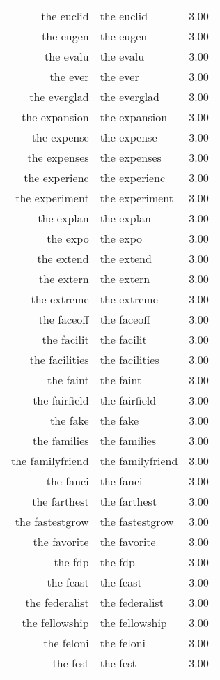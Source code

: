 \begin{table}[ht]
\begin{tabular}{rlr}
  the euclid & the euclid & 3.00 \\ 
  the eugen & the eugen & 3.00 \\ 
  the evalu & the evalu & 3.00 \\ 
  the ever & the ever & 3.00 \\ 
  the everglad & the everglad & 3.00 \\ 
  the expansion & the expansion & 3.00 \\ 
  the expense & the expense & 3.00 \\ 
  the expenses & the expenses & 3.00 \\ 
  the experienc & the experienc & 3.00 \\ 
  the experiment & the experiment & 3.00 \\ 
  the explan & the explan & 3.00 \\ 
  the expo & the expo & 3.00 \\ 
  the extend & the extend & 3.00 \\ 
  the extern & the extern & 3.00 \\ 
  the extreme & the extreme & 3.00 \\ 
  the faceoff & the faceoff & 3.00 \\ 
  the facilit & the facilit & 3.00 \\ 
  the facilities & the facilities & 3.00 \\ 
  the faint & the faint & 3.00 \\ 
  the fairfield & the fairfield & 3.00 \\ 
  the fake & the fake & 3.00 \\ 
  the families & the families & 3.00 \\ 
  the familyfriend & the familyfriend & 3.00 \\ 
  the fanci & the fanci & 3.00 \\ 
  the farthest & the farthest & 3.00 \\ 
  the fastestgrow & the fastestgrow & 3.00 \\ 
  the favorite & the favorite & 3.00 \\ 
  the fdp & the fdp & 3.00 \\ 
  the feast & the feast & 3.00 \\ 
  the federalist & the federalist & 3.00 \\ 
  the fellowship & the fellowship & 3.00 \\ 
  the feloni & the feloni & 3.00 \\ 
  the fest & the fest & 3.00 \\ 

\end{tabular}
\end{table}
